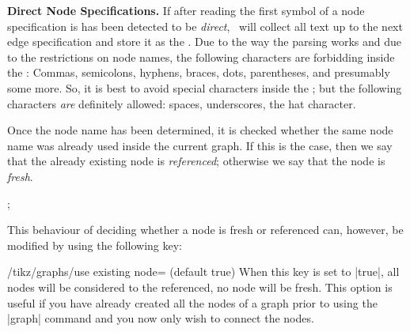 \medskip
\textbf{Direct Node Specifications.} If after reading the first symbol
of a node specification is has been detected to be \emph{direct},
\tikzname\ will collect all text up to the next edge
specification and store it as the . Due to the way the
parsing works and due to the restrictions on node names, the following
characters are forbidding inside the : Commas,
semicolons, hyphens, braces, dots, parentheses, and
presumably some more. So, it is best to avoid special characters
inside the ; but the following characters \emph{are}
definitely allowed: spaces, underscores, the hat character.

Once the node name has been determined, it is checked whether the same
node name was already used inside the current graph. If this is the
case, then we say that the already existing node is \emph{referenced};
otherwise we say that the node is \emph{fresh}.

\begin{codeexample}[]
\tikz {};
\end{codeexample}

This behaviour of
deciding whether a node is fresh or referenced can, however, be
modified by using the following key:
\begin{key}{/tikz/graphs/use existing node= (default true)}
  When this key is set to |true|, all nodes will be considered to the
  referenced, no node will be fresh. This option is useful if you have
  already created all the nodes of a graph prior to using the |graph|
  command and you now only wish to connect the nodes.
\end{key}

